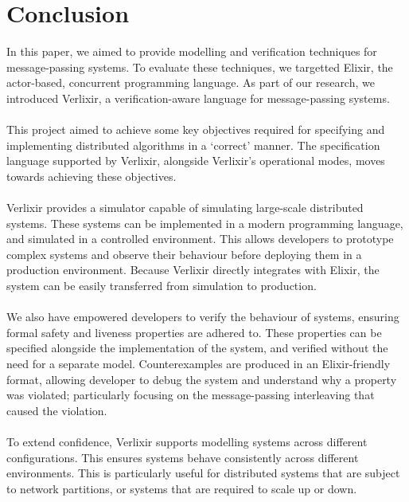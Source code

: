 \chapter{Conclusion}
In this paper, we aimed to provide modelling and verification techniques for message-passing systems. To evaluate these techniques, we targetted Elixir, the actor-based, concurrent programming language. As part of our research, we introduced Verlixir, a verification-aware language for message-passing systems.
\\ \\
This project aimed to achieve some key objectives required for specifying and implementing distributed algorithms in a `correct' manner. The specification language supported by Verlixir, alongside Verlixir's operational modes, moves towards achieving these objectives.
\\ \\
Verlixir provides a simulator capable of simulating large-scale distributed systems. These systems can be implemented in a modern programming language, and simulated in a controlled environment. This allows developers to prototype complex systems and observe their behaviour before deploying them in a production environment. Because Verlixir directly integrates with Elixir, the system can be easily transferred from simulation to production.
\\ \\
We also have empowered developers to verify the behaviour of systems, ensuring formal safety and liveness properties are adhered to. These properties can be specified alongside the implementation of the system, and verified without the need for a separate model. Counterexamples are produced in an Elixir-friendly format, allowing developer to debug the system and understand why a property was violated; particularly focusing on the message-passing interleaving that caused the violation.
\\ \\
To extend confidence, Verlixir supports modelling systems across different configurations. This ensures systems behave consistently across different environments. This is particularly useful for distributed systems that are subject to network partitions, or systems that are required to scale up or down.

